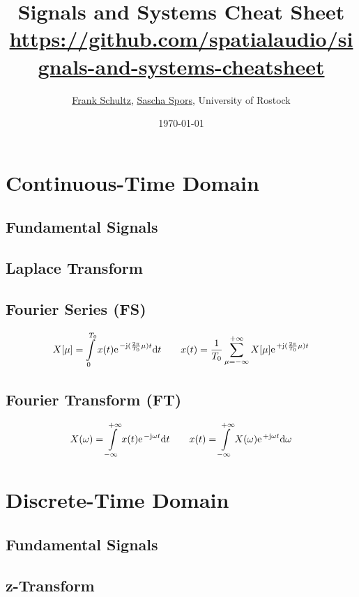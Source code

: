 \documentclass[landscape,columns=4]{cheatsheet}
\title{Signals and Systems Cheat Sheet\\
\tiny{\url{https://github.com/spatialaudio/signals-and-systems-cheatsheet}}}
\author{
\href{mailto:frank.schultz@uni-rostock.de}{Frank Schultz},
\href{mailto:sascha.spors@uni-rostock.de}{Sascha Spors},
University of Rostock
}
\date{\today}
\begin{document}
\maketitle

\section{Continuous-Time Domain}

\subsection{Fundamental Signals}

\subsection{Laplace Transform}

\subsection{Fourier Series (FS)}
%
\begin{align*}
X[\mu] = \int\limits_{0}^{T_0} x(t) \e^{-\im (\frac{2\pi}{T_0} \mu) t}\mathrm{d}t
\qquad
x(t) = \frac{1}{T_0}\sum\limits_{\mu=-\infty}^{+\infty} X[\mu] \e^{+\im (\frac{2\pi}{T_0} \mu) t}
\end{align*}

\subsection{Fourier Transform (FT)}
%
\begin{align*}
X(\omega) = \int\limits_{-\infty}^{+\infty} x(t) \e^{-\im \omega t}\mathrm{d}t
\qquad
x(t) = \int\limits_{-\infty}^{+\infty} X(\omega) \e^{+\im \omega t}\mathrm{d}\omega
\end{align*}



\section{Discrete-Time Domain}

\subsection{Fundamental Signals}

\subsection{z-Transform}
\end{document}
